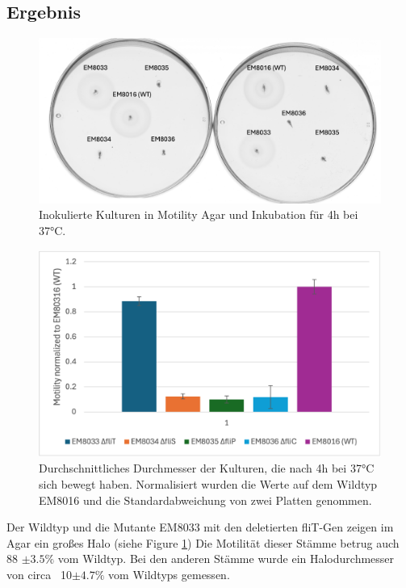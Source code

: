 \documentclass[oneside,10pt,a4paper]{report}
\begin{document}
			
			\subsection{Ergebnis}
			\begin{figure}[H]
				\centering
				\includegraphics[scale=0.5]{Exp6motility.png}
				\caption{Inokulierte Kulturen in Motility Agar und Inkubation für 4h bei 37°C.}
				\label{fig: Motilitybild}
			\end{figure}
			\begin{figure}[H]
				\centering
				\includegraphics[scale=0.7]{motilitybar.png}
				\caption{Durchschnittliches Durchmesser der Kulturen, die nach 4h bei 37°C sich bewegt haben. Normalisiert wurden die Werte auf dem Wildtyp EM8016 und die Standardabweichung von zwei Platten genommen.}
				\label{fig: Motilitychart}
			\end{figure}
			
			Der Wildtyp und die Mutante EM8033 mit den deletierten fliT-Gen zeigen im Agar ein großes Halo (siehe Figure \ref{fig: Motilitybild}) Die Motilität dieser Stämme betrug auch 88 $\pm 3.5\%$ vom Wildtyp. Bei den anderen Stämme wurde ein Halodurchmesser von circa ~10$\pm 4.7\%$ vom Wildtyps gemessen.
			
\end{document}
